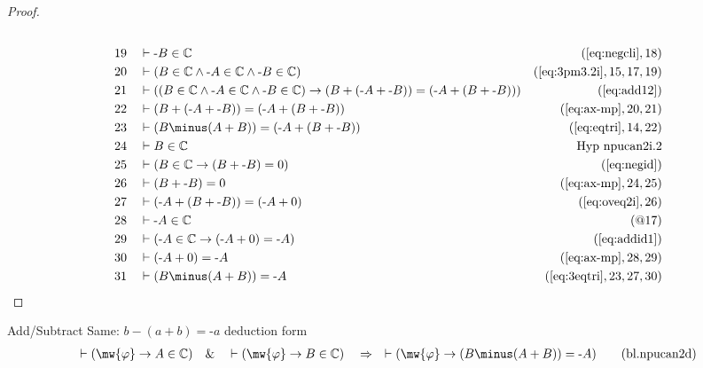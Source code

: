 \begin{proof}
\begin{align}
  \\ 19 &&  & \vdash \textrm{-} B \in \mathbb{C}&(\mbox{\ref{eq:negcli}},18)\notag
  \\ 20 &&  & \vdash ( B \in \mathbb{C} \wedge \textrm{-} A \in \mathbb{C} \wedge \textrm{-} B \in \mathbb{C} )&(\mbox{\ref{eq:3pm3.2i}},15,17,19)\notag
  \\ 21 &&  & \vdash ( ( B \in \mathbb{C} \wedge \textrm{-} A \in \mathbb{C} \wedge \textrm{-} B \in \mathbb{C} ) \rightarrow ( B + ( \textrm{-} A + \textrm{-} B ) ) = ( \textrm{-} A + ( B + \textrm{-} B ) ) )&(\mbox{\ref{eq:add12}})\notag
  \\ 22 &&  & \vdash ( B + ( \textrm{-} A + \textrm{-} B ) ) = ( \textrm{-} A + ( B + \textrm{-} B ) )&(\mbox{\ref{eq:ax-mp}},20,21)\notag
  \\ 23 &&  & \vdash ( B \minus ( A + B ) ) = ( \textrm{-} A + ( B + \textrm{-} B ) )&(\mbox{\ref{eq:eqtri}},14,22)\notag
  \\ 24 &&  & \vdash B \in \mathbb{C}&\text{Hyp~npucan2i.2}\notag%
  \\ 25 &&  & \vdash ( B \in \mathbb{C} \rightarrow ( B + \textrm{-} B ) = 0 )&(\mbox{\ref{eq:negid}})\notag
  \\ 26 &&  & \vdash ( B + \textrm{-} B ) = 0&(\mbox{\ref{eq:ax-mp}},24,25)\notag
  \\ 27 &&  & \vdash ( \textrm{-} A + ( B + \textrm{-} B ) ) = ( \textrm{-} A + 0 )&(\mbox{\ref{eq:oveq2i}},26)\notag
  \\ 28 &&  & \vdash \textrm{-} A \in \mathbb{C}&(@17)\notag
  \\ 29 &&  & \vdash ( \textrm{-} A \in \mathbb{C} \rightarrow ( \textrm{-} A + 0 ) = \textrm{-} A )&(\mbox{\ref{eq:addid1}})\notag
  \\ 30 &&  & \vdash ( \textrm{-} A + 0 ) = \textrm{-} A&(\mbox{\ref{eq:ax-mp}},28,29)\notag
  \\ 31 &&  & \vdash ( B \minus ( A + B ) ) = \textrm{-} A&(\mbox{\ref{eq:3eqtri}},23,27,30)\notag
\end{align}
\end{proof}

\begin{lemma} Add/Subtract Same: $b \minus ( a + b )
= \textrm{-} a$ deduction form
\begin{align}
\vdash ( \mw{\varphi} \rightarrow A \in \mathbb{C} )\quad\&\quad \vdash (
    \mw{\varphi} \rightarrow B \in \mathbb{C} )\quad\Rightarrow\quad \vdash (
    \mw{\varphi} \rightarrow ( B \minus ( A + B ) ) = \textrm{-} A
    )\label{eq:bl.npucan2d}\tag{bl.npucan2d}
\end{align}
\end{lemma}

